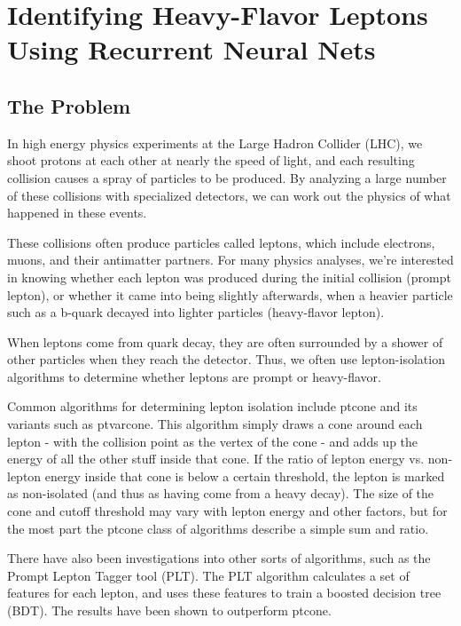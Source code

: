 \chapter{Identifying Heavy-Flavor Leptons Using Recurrent Neural Nets}

\section{The Problem}


In high energy physics experiments at the Large Hadron Collider (LHC), we shoot protons at each other at nearly the speed of light, and each resulting collision causes a spray of particles to be produced. By analyzing a large number of these collisions with specialized detectors, we can work out the physics of what happened in these events.

These collisions often produce particles called leptons, which include electrons, muons, and their antimatter partners. For many physics analyses, we're interested in knowing whether each lepton was produced during the initial collision (prompt lepton), or whether it came into being slightly afterwards, when a heavier particle such as a b-quark decayed into lighter particles (heavy-flavor lepton).

When leptons come from quark decay, they are often surrounded by a shower of other particles when they reach the detector. Thus, we often use lepton-isolation algorithms to determine whether leptons are prompt or heavy-flavor.


Common algorithms for determining lepton isolation include ptcone and its variants such as ptvarcone. This algorithm simply draws a cone around each lepton - with the collision point as the vertex of the cone - and adds up the energy of all the other stuff inside that cone. If the ratio of lepton energy vs. non-lepton energy inside that cone is below a certain threshold, the lepton is marked as non-isolated (and thus as having come from a heavy decay). The size of the cone and cutoff threshold may vary with lepton energy and other factors, but for the most part the ptcone class of algorithms describe a simple sum and ratio.

There have also been investigations into other sorts of algorithms, such as the Prompt Lepton Tagger tool (PLT). The PLT algorithm calculates a set of features for each lepton, and uses these features to train a boosted decision tree (BDT). The results have been shown to outperform ptcone.

